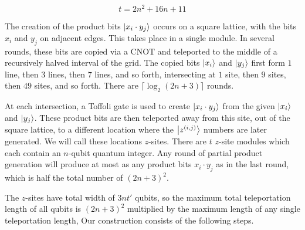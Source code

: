 \documentclass[twoside]{article}
\begin{document}
\begin{equation}
t=2n^2+16n+11
\end{equation}

The creation of the product bits $\left\vert{x_i \cdot y_j}\right\rangle$ occurs on a
square lattice, with the bits $x_i$ and $y_j$ on adjacent edges. This takes
place in a single module. In several
rounds, these bits are copied via a CNOT and teleported to the middle of
a recursively halved interval of the grid. The copied bits $\left\vert{x_i}\right\rangle$ and
$\left\vert{y_j}\right\rangle$
first form $1$ line, then $3$ lines, then $7$ lines, and so forth,
intersecting at $1$ site, then $9$ sites, then $49$ sites, and so forth.
There are $\lceil \log_2 (2n+3) \rceil$ rounds.

At each intersection, a Toffoli gate is used to create $\left\vert{x_i \cdot y_j}\right\rangle$
from the given $\left\vert{x_i}\right\rangle$ and $\left\vert{y_j}\right\rangle$. These product bits are then
teleported away from this site, out of the square lattice, to a different
location where the $\left\vert{z^{(i,j)}}\right\rangle$ numbers are later generated. We will
call these locations $z$-sites. There are $t$ $z$-site modules which each contain 
an $n$-qubit quantum integer. Any
round of partial product generation will produce at most as any product
bits $x_i \cdot y_j$ as in the last round, which is half the total number
of $(2n+3)^2$.

The $z$-sites have total width of $3nt'$ qubits, so the maximum total
teleportation length of all qubits is $(2n+3)^2$ multiplied by the maximum
length of any single teleportation length,
Our construction consists of the following steps.
\end{document}
